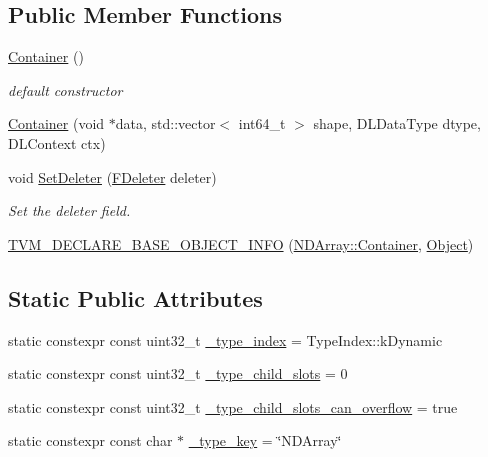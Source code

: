 \subsection*{Public Member Functions}
\begin{DoxyCompactItemize}
\item 
\hyperlink{classtvm_1_1runtime_1_1NDArray_1_1Container_a39b39ce5a2a658b44944381f1835404a}{Container} ()
\begin{DoxyCompactList}\small\item\em default constructor \end{DoxyCompactList}\item 
\hyperlink{classtvm_1_1runtime_1_1NDArray_1_1Container_a39edb3823aeabc846cc38e0fae1a3c37}{Container} (void $\ast$data, std\+::vector$<$ int64\+\_\+t $>$ shape, D\+L\+Data\+Type dtype, D\+L\+Context ctx)
\item 
void \hyperlink{classtvm_1_1runtime_1_1NDArray_1_1Container_a56109cfc826b26172f084c3790144351}{Set\+Deleter} (\hyperlink{classtvm_1_1runtime_1_1Object_a9e84841ca982bff376a978ade0132631}{F\+Deleter} deleter)
\begin{DoxyCompactList}\small\item\em Set the deleter field. \end{DoxyCompactList}\item 
\hyperlink{classtvm_1_1runtime_1_1NDArray_1_1Container_adce920eec8aecc847e0ca7d7b4cb169c}{T\+V\+M\+\_\+\+D\+E\+C\+L\+A\+R\+E\+\_\+\+B\+A\+S\+E\+\_\+\+O\+B\+J\+E\+C\+T\+\_\+\+I\+N\+FO} (\hyperlink{classtvm_1_1runtime_1_1NDArray_1_1Container}{N\+D\+Array\+::\+Container}, \hyperlink{classtvm_1_1runtime_1_1Object}{Object})
\end{DoxyCompactItemize}
\subsection*{Static Public Attributes}
\begin{DoxyCompactItemize}
\item 
static constexpr const uint32\+\_\+t \hyperlink{classtvm_1_1runtime_1_1NDArray_1_1Container_a2aa70a8af3dcb461cad06e57ec3ad7b6}{\+\_\+type\+\_\+index} = Type\+Index\+::k\+Dynamic
\item 
static constexpr const uint32\+\_\+t \hyperlink{classtvm_1_1runtime_1_1NDArray_1_1Container_a654a0db794bc7453907cafdfd1b6419e}{\+\_\+type\+\_\+child\+\_\+slots} = 0
\item 
static constexpr const uint32\+\_\+t \hyperlink{classtvm_1_1runtime_1_1NDArray_1_1Container_a5010c341b2c9a0976af2d763a277e21d}{\+\_\+type\+\_\+child\+\_\+slots\+\_\+can\+\_\+overflow} = true
\item 
static constexpr const char $\ast$ \hyperlink{classtvm_1_1runtime_1_1NDArray_1_1Container_a5f89a73ae36d22b46545cc5906e92a3d}{\+\_\+type\+\_\+key} = \char`\"{}N\+D\+Array\char`\"{}
\end{DoxyCompactItemize}
